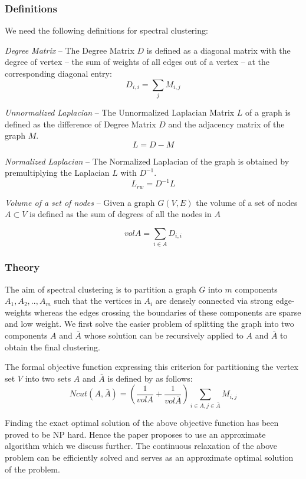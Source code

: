 \documentclass[a4paper,12pt]{report}
\begin{document}
\subsubsection{Definitions}
We need the following definitions for spectral clustering:

{\it Degree Matrix} -- The Degree Matrix $D$ is defined as a diagonal
matrix with the degree of vertex -- the sum of weights of all edges
out of a vertex -- at the corresponding diagonal entry:
$$
D_{i,i} = \sum_j M_{i,j}
$$

{\it Unnormalized Laplacian} -- The Unnormalized Laplacian Matrix $L$
of a graph is defined as the difference of Degree Matrix $D$ and the
adjacency matrix of the graph $M$.
$$
L = D - M
$$

{\it Normalized Laplacian} -- The Normalized Laplacian of the graph is
obtained by premultiplying the Laplacian $L$ with $D^{-1}$.
$$
L_{rw} = D^{-1} L
$$

{\it Volume of a set of nodes} -- Given a graph $G(V,E)$ the volume of
a set of nodes $A \subset V$ is defined as the sum of degrees of all
the nodes in $A$

$$
vol A = \sum_{i \in A} D_{i,i}
$$

\subsubsection{Theory}
The aim of spectral clustering is to partition a graph $G$ into $m$
components $A_1,A_2,..,A_m$ such that the vertices in $A_i$ are
densely connected via strong edge-weights whereas the edges crossing
the boundaries of these components are sparse and low weight. We first
solve the easier problem of splitting the graph into two components
$A$ and $\bar{A}$ whose solution can be recursively applied to $A$ and
$\bar{A}$ to obtain the final clustering.

The formal objective function expressing this criterion for
partitioning the vertex set $V$ into two sets $A$ and $\bar{A}$ is
defined by \cite{shimalik} as follows:
$$
Ncut(A,\bar{A}) = \left(\frac{1}{vol A} + \frac{1}{vol \bar{A}}\right) \sum_{i \in A, j
  \in \bar{A}} M_{i,j}
$$

Finding the exact optimal solution of the above objective function has
been proved to be NP hard. Hence the paper \cite{shimalik} proposes to
use an approximate algorithm which we discuss further. The continuous
relaxation of the above problem can be efficiently solved and serves
as an approximate optimal solution of the problem.
\end{document}
